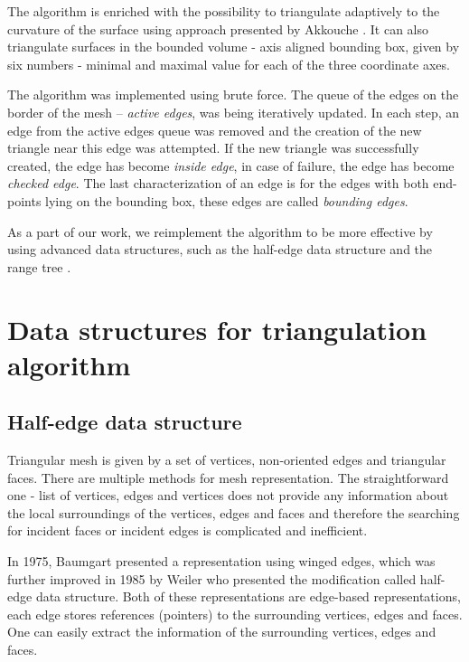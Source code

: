 The algorithm is enriched with the possibility to triangulate adaptively
to the curvature of the surface using approach presented by Akkouche 
\cite{akkouche2001adaptive}. It can also triangulate surfaces in the
bounded volume - axis aligned bounding box, given by six numbers - minimal
and maximal value for each of the three coordinate axes.

The algorithm was implemented using brute force. The queue of the edges
on the border of the mesh -- \textit{active edges}, was being iteratively updated. 
In each step, an edge from the active edges queue was removed
and the creation of the new triangle near this edge was attempted.
If the new triangle was successfully created, the edge has become 
\textit{inside edge}, in case of failure, the edge has become 
\textit{checked edge}. The last characterization of an edge is for
the edges with both end-points lying on the bounding box, these edges
are called \textit{bounding edges}.

As a part of our work, we reimplement the algorithm to be more effective by
using advanced data structures, such as the half-edge data structure 
\cite{kettner1999using} and the range tree \cite{lueker1978data}.

\section{Data structures for triangulation algorithm}
\label{sub2.5}

\subsection{Half-edge data structure}
Triangular mesh is given by a set of vertices, non-oriented edges and triangular faces.
There are multiple methods for mesh representation. The straightforward one -
list of vertices, edges and vertices does not provide any information about
the local surroundings of the vertices, edges and faces and therefore the searching
for incident faces or incident edges is complicated and inefficient.

In 1975, Baumgart \cite{baumgart1975polyhedron} presented a representation
using winged edges, which was further improved in 1985 by Weiler \cite{weiler1985edge}
who presented the modification called half-edge data structure.
Both of these representations are edge-based representations, each edge stores
references (pointers) to the surrounding vertices, edges and faces. One can easily extract the information of the
surrounding vertices, edges and faces.


